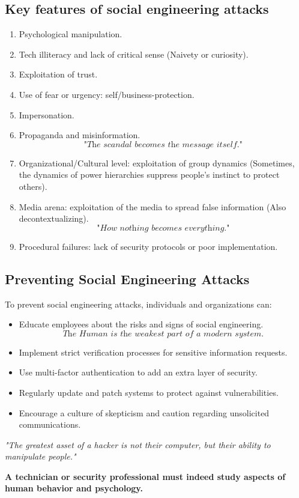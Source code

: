 \subsection*{Key features of social engineering attacks}
\begin{enumerate}
    \item Psychological manipulation.
    \item Tech illiteracy and lack of critical sense (Naivety or curiosity).
    \item Exploitation of trust.
    \item Use of fear or urgency: self/business-protection. 
    \item Impersonation.
    \item Propaganda and misinformation.
    \[
        \textit{"The scandal becomes the message itself."}
    \]
    \item Organizational/Cultural level: exploitation of group dynamics (Sometimes, the dynamics of power hierarchies suppress people’s instinct to protect others).
    \item Media arena: exploitation of the media to spread false information (Also decontextualizing).
    \[
        \textit{"How nothing becomes everything."}
    \]
    \item Procedural failures: lack of security protocols or poor implementation.
\end{enumerate}

\subsection*{Preventing Social Engineering Attacks}

To prevent social engineering attacks, individuals and organizations can:
\begin{itemize}
    \item Educate employees about the risks and signs of social engineering.
    \[
        \textit{The Human is the weakest part of a modern system.}
    \]
    \item Implement strict verification processes for sensitive information requests.
    \item Use multi-factor authentication to add an extra layer of security.
    \item Regularly update and patch systems to protect against vulnerabilities.
    \item Encourage a culture of skepticism and caution regarding unsolicited communications.
\end{itemize}

\vspace{0.5cm}

\begin{center}
    \textit{"The greatest asset of a hacker is not their computer, but their ability to manipulate people."}
\end{center}

\vspace{1 cm}

\begin{center}
    \textbf{A technician or security professional must indeed study aspects of human behavior and psychology.}
\end{center}